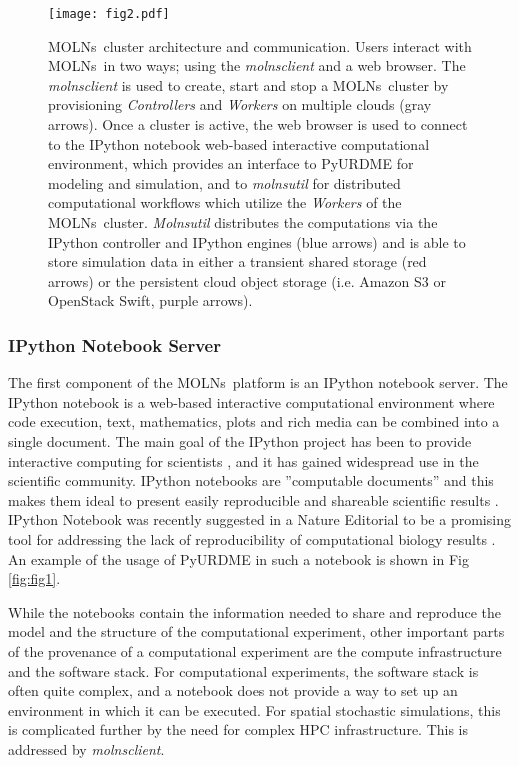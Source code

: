 \documentclass[final,leqno,onefignum,onetabnum]{siamltex1213}
\def\packagename {MOLNs}
\begin{document}
\begin{figure}[htpb]
\begin{center}
\texttt{[image: fig2.pdf]}
\end{center}
\caption{\packagename~cluster architecture and communication.
Users interact with \packagename~in two ways; using the \emph{molnsclient} and a web browser.
The \emph{molnsclient} is used to create, start and stop a \packagename~cluster by provisioning \emph{Controllers} and \emph{Workers} on multiple clouds (gray arrows).  Once a cluster is active, the web browser is used to connect to the IPython notebook web-based interactive computational environment, which provides an interface to PyURDME for modeling and simulation, and to \emph{molnsutil} for distributed computational workflows which utilize the \emph{Workers} of the \packagename~cluster.  \emph{Molnsutil} distributes the computations via the IPython controller and IPython engines (blue arrows) and is able to store simulation data in either a transient shared storage (red arrows) or the persistent cloud object storage (i.e. Amazon S3 or OpenStack Swift, purple arrows).  
}
\label{fig:fig2}
\end{figure}

\subsubsection{IPython Notebook Server}
\label{sec:ipython}
The first component of the \packagename~platform is an IPython notebook server. 
The IPython notebook is a web-based interactive computational environment where code execution, text, mathematics, plots and rich media can be combined into a single document. The main goal of the IPython project has been to provide interactive computing for scientists \cite{ipython}, and it has gained widespread use in the scientific community. IPython notebooks are ''computable documents'' and this makes them ideal to present easily reproducible and shareable scientific results \cite{ragan2013collaborative}. IPython Notebook was recently suggested in a Nature Editorial to be a promising tool for addressing the lack of reproducibility of computational biology results \cite{shen2014}. An example of the usage of PyURDME in such a notebook is shown in Fig \ref{fig:fig1}. 

While the notebooks contain the information needed to share and reproduce the model and the structure of the computational experiment, other important parts of the provenance of a computational experiment are the compute infrastructure and the software stack. For computational experiments, the software stack is often quite complex, and a notebook does not provide a way to set up an environment in which it can be executed. For spatial stochastic simulations, this is complicated further by the need for complex HPC infrastructure. This is addressed by \emph{molnsclient}.
\end{document}
